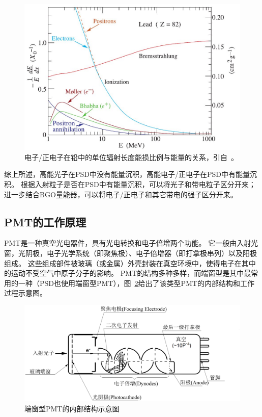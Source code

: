 \begin{figure}[h!]
\centering
\includegraphics[width=0.8\linewidth]{chap/description/fig/electron_energyloss}
\caption{电子/正电子在铅中的单位辐射长度能损比例与能量的关系，引自~\parencite{pdg_book}。}
\label{fig:ch2:electron_energyloss}
\end{figure}

综上所述，高能光子在PSD中没有能量沉积，高能电子/正电子在PSD中有能量沉积。
根据入射粒子是否在PSD中有能量沉积，可以将光子和带电粒子区分开来；进一步结合BGO量能器，可以将电子/正电子和其它带电的强子区分开来。

\subsection{PMT的工作原理}
PMT是一种真空光电器件，具有光电转换和电子倍增两个功能。
它一般由入射光窗，光阴极，电子光学系统（即聚焦极）、电子倍增器（即打拿极串列）以及阳极组成。
这些组成部件被玻璃（或金属）外壳封装在真空环境中，使得电子在其中的运动不受空气中原子分子的影响。
PMT的结构多种多样，而端窗型是其中最常用的一种（PSD也使用端窗型PMT），图~\ref{fig:ch2:pmt_structure}给出了该类型PMT的内部结构和工作过程示意图。

\begin{figure}[h!]
\centering
\includegraphics[width=\linewidth]{chap/description/fig/pmt_structure}
\caption{端窗型PMT的内部结构示意图}
\label{fig:ch2:pmt_structure}
\end{figure}

